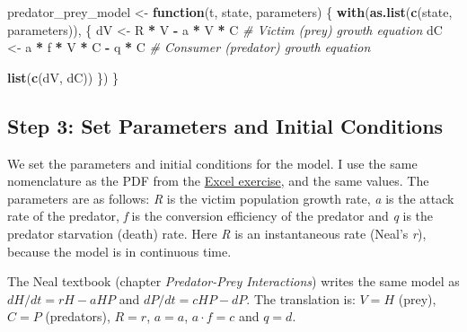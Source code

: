 \documentclass[
  a4paper]{book}
\newenvironment{Shaded}{\begin{snugshade}}{\end{snugshade}}
\newcommand{\CommentTok}[1]{\textcolor[rgb]{0.56,0.35,0.01}{\textit{#1}}}
\newcommand{\ControlFlowTok}[1]{\textcolor[rgb]{0.13,0.29,0.53}{\textbf{#1}}}
\newcommand{\FunctionTok}[1]{\textcolor[rgb]{0.13,0.29,0.53}{\textbf{#1}}}
\newcommand{\NormalTok}[1]{#1}
\newcommand{\OtherTok}[1]{\textcolor[rgb]{0.56,0.35,0.01}{#1}}
\newcommand{\SpecialCharTok}[1]{\textcolor[rgb]{0.81,0.36,0.00}{\textbf{#1}}}
\begin{document}
\begin{Shaded}
\begin{Highlighting}[]
\NormalTok{predator\_prey\_model }\OtherTok{\textless{}{-}} \ControlFlowTok{function}\NormalTok{(t, state, parameters) \{}
  \FunctionTok{with}\NormalTok{(}\FunctionTok{as.list}\NormalTok{(}\FunctionTok{c}\NormalTok{(state, parameters)), \{}
\NormalTok{    dV }\OtherTok{\textless{}{-}}\NormalTok{ R }\SpecialCharTok{*}\NormalTok{ V }\SpecialCharTok{{-}}\NormalTok{ a }\SpecialCharTok{*}\NormalTok{ V }\SpecialCharTok{*}\NormalTok{ C  }\CommentTok{\# Victim (prey) growth equation}
\NormalTok{    dC }\OtherTok{\textless{}{-}}\NormalTok{ a }\SpecialCharTok{*}\NormalTok{ f }\SpecialCharTok{*}\NormalTok{ V }\SpecialCharTok{*}\NormalTok{ C }\SpecialCharTok{{-}}\NormalTok{ q }\SpecialCharTok{*}\NormalTok{ C  }\CommentTok{\# Consumer (predator) growth equation}
    
    \FunctionTok{list}\NormalTok{(}\FunctionTok{c}\NormalTok{(dV, dC))}
\NormalTok{  \})}
\NormalTok{\}}
\end{Highlighting}
\end{Shaded}

\subsection{Step 3: Set Parameters and Initial Conditions}\label{step-3-set-parameters-and-initial-conditions}

We set the parameters and initial conditions for the model. I use the same nomenclature as the PDF from the \href{https://jonesor.github.io/BB512_Book/lotka-volterra-predator-prey-dynamics.html}{Excel exercise}, and the same values. The parameters are as follows: \emph{R} is the victim population growth rate, \emph{a} is the attack rate of the predator, \emph{f} is the conversion efficiency of the predator and \emph{q} is the predator starvation (death) rate. Here \emph{R} is an instantaneous rate (Neal's \emph{r}), because the model is in continuous time.

The Neal textbook (chapter \emph{Predator-Prey Interactions}) writes the same model as \(dH/dt = rH - aHP\) and \(dP/dt = cHP - dP\). The translation is: \(V = H\) (prey), \(C = P\) (predators), \(R = r\), \(a = a\), \(a \cdot f = c\) and \(q = d\).
\end{document}
